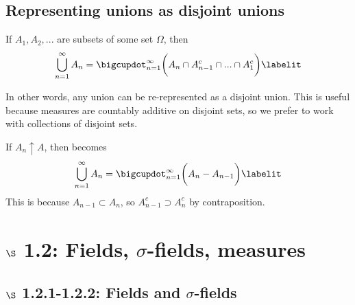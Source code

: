 \documentclass{article} %
\newcommand{\sfs}{$\sigma$-fields}
\begin{document}
\subsection{Representing unions as disjoint unions} \label{sec:representing_unions_as_disjoint_unions}
 
\begin{remark}
If $A_1,A_2,...$ are subsets of some set $\Omega$, then
\begin{align*} 
\bigcup_{n=1}^\infty A_n = \bigcupdot_{n=1}^\infty \bigg(A_n \cap A_{n-1}^c \cap ... \cap A_1^c \bigg) 	
\labelit \label{eqn:union_as_disjoint_union}
\end{align*}

In other words, any union can be re-represented as a disjoint union. This is useful because measures are countably additive on disjoint sets, so we prefer to work with collections of disjoint sets.
\label{rk:rerepresenting_unions_as_disjoint_unions}
\end{remark}

\begin{remark}
If $A_n \uparrow A$, then  becomes
\begin{align*}
	\bigcup_{n=1}^\infty A_n = \bigcupdot_{n=1}^\infty \bigg( A_n - A_{n-1} \bigg) 
\labelit \label{eqn:union_as_disjoint_union_for_increasing_sequences}
\end{align*}
This is because $A_{n-1} \subset A_{n}$, so $A_{n-1}^c \supset A_{n}^c$ by contraposition.	
\end{remark}

\section{$\S$ 1.2: Fields, \sfs, measures}

\subsection{$\S$ 1.2.1-1.2.2: Fields and \sfs}
\end{document}
